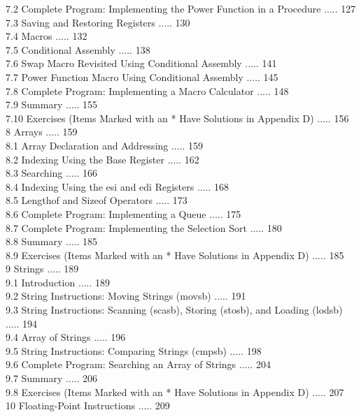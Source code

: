 \documentclass[10pt]{article}
\begin{document}
7.2 Complete Program: Implementing the Power Function in a Procedure ..... 127\\
7.3 Saving and Restoring Registers ..... 130\\
7.4 Macros ..... 132\\
7.5 Conditional Assembly ..... 138\\
7.6 Swap Macro Revisited Using Conditional Assembly ..... 141\\
7.7 Power Function Macro Using Conditional Assembly ..... 145\\
7.8 Complete Program: Implementing a Macro Calculator ..... 148\\
7.9 Summary ..... 155\\
7.10 Exercises (Items Marked with an * Have Solutions in Appendix D) ..... 156\\
8 Arrays ..... 159\\
8.1 Array Declaration and Addressing ..... 159\\
8.2 Indexing Using the Base Register ..... 162\\
8.3 Searching ..... 166\\
8.4 Indexing Using the esi and edi Registers ..... 168\\
8.5 Lengthof and Sizeof Operators ..... 173\\
8.6 Complete Program: Implementing a Queue ..... 175\\
8.7 Complete Program: Implementing the Selection Sort ..... 180\\
8.8 Summary ..... 185\\
8.9 Exercises (Items Marked with an * Have Solutions in Appendix D) ..... 185\\
9 Strings ..... 189\\
9.1 Introduction ..... 189\\
9.2 String Instructions: Moving Strings (movsb) ..... 191\\
9.3 String Instructions: Scanning (scasb), Storing (stosb), and Loading (lodsb) ..... 194\\
9.4 Array of Strings ..... 196\\
9.5 String Instructions: Comparing Strings (cmpsb) ..... 198\\
9.6 Complete Program: Searching an Array of Strings ..... 204\\
9.7 Summary ..... 206\\
9.8 Exercises (Items Marked with an * Have Solutions in Appendix D) ..... 207\\
10 Floating-Point Instructions ..... 209\\
\end{document}

